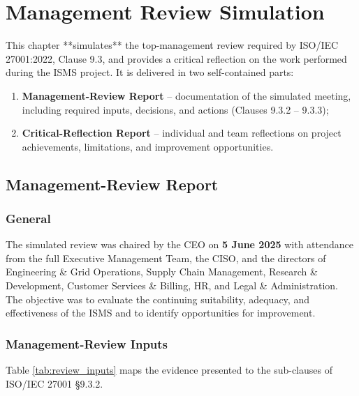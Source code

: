 \chapter{Management Review Simulation}
\label{chap:management_review}

This chapter **simulates** the top-management review required by
ISO/IEC 27001:2022, Clause 9.3, and provides a critical reflection on the work
performed during the \ac{ISMS} project.  It is delivered in two
self-contained parts:

\begin{enumerate}
  \item \textbf{Management-Review Report} – documentation of the simulated
        meeting, including required inputs, decisions, and actions
        (Clauses 9.3.2 – 9.3.3);
  \item \textbf{Critical-Reflection Report} – individual and team
        reflections on project achievements, limitations, and improvement
        opportunities.
\end{enumerate}

\section{Management-Review Report}
\label{sec:mgmt_review_report}

\subsection{General}

The simulated review was chaired by the \ac{CEO} on
\textbf{5 June 2025} with attendance from the full Executive Management
Team, the \ac{CISO}, and the directors of Engineering \& Grid Operations,
Supply Chain Management, Research \& Development, Customer
Services \& Billing, \ac{HR}, and Legal \& Administration.
The objective was to evaluate the continuing suitability, adequacy, and
effectiveness of the \ac{ISMS} and to identify opportunities for
improvement.

\subsection{Management-Review Inputs}

Table \ref{tab:review_inputs} maps the evidence presented to the
sub-clauses of ISO/IEC 27001 §9.3.2.


